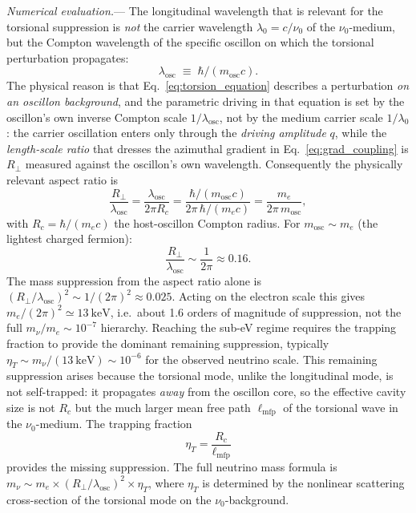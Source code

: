 \documentclass[11pt]{article}
\begin{document}
\textit{Numerical evaluation.}---%
The longitudinal wavelength that is relevant
for the torsional suppression is \emph{not}
the carrier wavelength $\lambda_0 = c/\nu_0$
of the $\nu_0$-medium, but the Compton
wavelength of the specific oscillon on which
the torsional perturbation propagates:
\begin{equation}
  \lambda_{\mathrm{osc}}
  \;\equiv\; \hbar/(m_{\mathrm{osc}} c).
\end{equation}
The physical reason is that
Eq.~\eqref{eq:torsion_equation} describes a
perturbation \emph{on an oscillon background},
and the parametric driving in that equation is
set by the oscillon's own inverse Compton scale
$1/\lambda_{\mathrm{osc}}$, not by the medium
carrier scale $1/\lambda_0$: the carrier
oscillation enters only through the
\emph{driving amplitude} $q$, while the
\emph{length-scale ratio} that dresses the
azimuthal gradient in
Eq.~\eqref{eq:grad_coupling} is $R_\perp$
measured against the oscillon's own wavelength.
Consequently the physically relevant aspect
ratio is
\begin{equation}\label{eq:Rperp_corrected}
  \frac{R_\perp}{\lambda_{\mathrm{osc}}}
  = \frac{\lambda_{\mathrm{osc}}}{2\pi R_c}
  = \frac{\hbar/(m_{\mathrm{osc}} c)}
  {2\pi\,\hbar/(m_e c)}
  = \frac{m_e}{2\pi\,m_{\mathrm{osc}}},
\end{equation}
with $R_c = \hbar/(m_e c)$ the host-oscillon
Compton radius.
For $m_{\mathrm{osc}}\sim m_e$ (the lightest
charged fermion):
\begin{equation}\label{eq:Rperp_final}
  \frac{R_\perp}{\lambda_{\mathrm{osc}}}
  \sim \frac{1}{2\pi}
  \approx 0.16.
\end{equation}
The mass suppression from the aspect ratio alone is
$(R_\perp/\lambda_{\mathrm{osc}})^2
\sim 1/(2\pi)^2 \approx 0.025$.  Acting on the
electron scale this gives
$m_e/(2\pi)^2 \simeq 13~\mathrm{keV}$, i.e.\ about
1.6 orders of magnitude of suppression, not the
full $m_\nu/m_e \sim 10^{-7}$ hierarchy.  Reaching
the sub-eV regime requires the trapping fraction
to provide the dominant remaining suppression,
typically $\eta_T \sim m_\nu/(13~\mathrm{keV})
\sim 10^{-6}$ for the observed neutrino scale.
This remaining suppression arises because the torsional mode,
unlike the longitudinal mode, is not self-trapped:
it propagates \emph{away} from the oscillon core,
so the effective cavity size is not $R_c$ but
the much larger mean free path
$\ell_{\mathrm{mfp}}$ of the torsional wave
in the $\nu_0$-medium.  The trapping fraction
\begin{equation}\label{eq:trapping_fraction}
  \eta_T = \frac{R_c}{\ell_{\mathrm{mfp}}}
\end{equation}
provides the missing suppression.
The full neutrino mass formula is
$m_\nu \sim m_e \times (R_\perp/\lambda_{\mathrm{osc}})^2
\times \eta_T$, where $\eta_T$ is determined by the
nonlinear scattering cross-section of the torsional
mode on the $\nu_0$-background.
\end{document}
